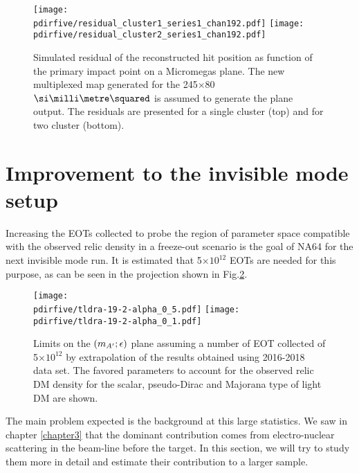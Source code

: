 \begin{figure}
    \centering
    \texttt{[image: \\pdirfive/residual\_cluster1\_series1\_chan192.pdf]}
    \texttt{[image: \\pdirfive/residual\_cluster2\_series1\_chan192.pdf]}
    \caption[Test of new multiplex map]{Simulated residual of the reconstructed hit position as function of the primary impact point on a Micromegas plane. The new multiplexed map generated for the 245$\times$80 $\mms$ is assumed to generate the plane output. The residuals are presented for a single cluster (top) and for two cluster (bottom).}
    \label{fig:mm-mult-study}
\end{figure}


\FloatBarrier\noindent
\section{Improvement to the invisible mode setup}
\label{ch5:sec:new-invismode-setup}

Increasing the EOTs collected to probe the region of parameter space compatible with the observed relic density in a freeze-out scenario is the goal of NA64 for the next invisible mode run. It is estimated that 5$\times 10^{12}$ EOTs are needed for this purpose, as can be seen in the projection shown in Fig.\ref{fig:dm-sens-proj}.

\begin{figure}[bht!]
  \centering
  \texttt{[image: \\pdirfive/tldra-19-2-alpha\_0\_5.pdf]}
  \texttt{[image: \\pdirfive/tldra-19-2-alpha\_0\_1.pdf]}
  \caption[Sensitivity projection for invisible mode 2021]{Limits on the $(m_{A'};\epsilon)$ plane assuming a number of EOT collected of 5$\times 10^{12}$ by extrapolation of the results obtained using 2016-2018 data set. The favored parameters to account for the observed relic DM density for the scalar, pseudo-Dirac and Majorana type of light DM are shown.}
  \label{fig:dm-sens-proj}
\end{figure}

The main problem expected is the background at this large statistics. We saw in chapter \ref{chapter3} that the dominant contribution comes from electro-nuclear scattering in the beam-line before the target. In this section, we will try to study them more in detail and estimate their contribution to a larger sample.


